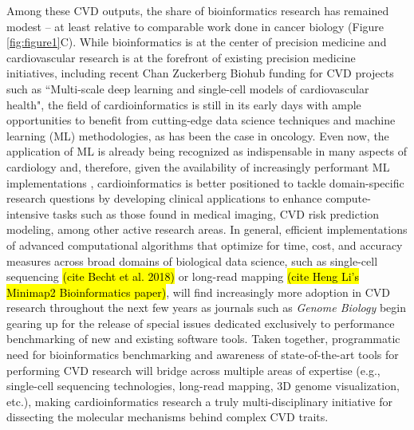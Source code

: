 \documentclass[letter]{bioinfo}
\begin{document}
Among these CVD outputs, the share of bioinformatics research has remained modest -- at least relative to comparable work done in cancer biology (Figure \ref{fig:figure1}C). While bioinformatics is at the center of precision medicine \citep{Gomez-Lopez:2017:Precision} and cardiovascular research is at the forefront of existing precision medicine initiatives, including recent Chan Zuckerberg Biohub funding for CVD projects such as ``Multi-scale deep learning and single-cell models of cardiovascular health", the field of cardioinformatics is still in its early days with ample opportunities to benefit from cutting-edge data science techniques and machine learning (ML) methodologies, as has been the case in oncology.  Even now, the application of ML is already being recognized as indispensable in many aspects of cardiology \citep{Shameer:2017:Translational,Shameer:2018:Machine} and, therefore, given the availability of increasingly performant ML implementations \citep{MLPerf:2018:MLPerf}, cardioinformatics is better positioned to tackle domain-specific research questions by developing clinical applications to enhance compute-intensive tasks such as those found in medical imaging, CVD risk prediction modeling, among other active research areas. In general, efficient implementations of advanced computational algorithms that optimize for time, cost, and accuracy measures across broad domains of biological data science, such as single-cell sequencing \hl{(cite Becht et al. 2018)} or long-read mapping \hl{(cite Heng Li's Minimap2 Bioinformatics paper)}, will find increasingly more adoption in CVD research throughout the next few years as journals such as \emph{Genome Biology} begin gearing up for the release of special issues dedicated exclusively to performance benchmarking of new and existing software tools.  Taken together, programmatic need for bioinformatics benchmarking and awareness of state-of-the-art tools for performing CVD research will bridge across multiple areas of expertise (e.g., single-cell sequencing technologies, long-read mapping, 3D genome visualization, etc.), making cardioinformatics research a truly multi-disciplinary initiative for dissecting the molecular mechanisms behind complex CVD traits.   
\end{document}
